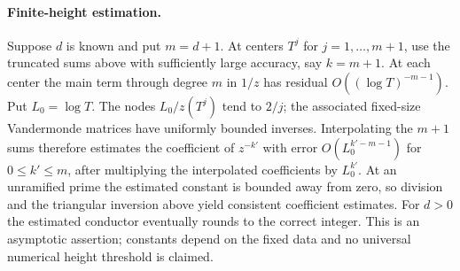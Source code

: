 \documentclass[11pt,letterpaper]{article}
\begin{document}
\paragraph{Finite-height estimation.}
Suppose $d$ is known and put $m=d+1$. At centers $T^j$ for
$j=1,\ldots,m+1$, use the truncated sums above with sufficiently large
accuracy, say $k=m+1$. At each center the main term through degree $m$
in $1/z$ has residual $O((\log T)^{-m-1})$. Put $L_0=\log T$. The
nodes $L_0/z(T^j)$ tend to $2/j$; the associated fixed-size Vandermonde
matrices have uniformly bounded inverses. Interpolating the $m+1$ sums
therefore estimates the coefficient of $z^{-k'}$ with error
$O(L_0^{k'-m-1})$ for $0\le k'\le m$, after multiplying the
interpolated coefficients by $L_0^{k'}$. At an unramified prime the
estimated constant is bounded away from zero, so division and the
triangular inversion above yield consistent coefficient estimates.
For $d>0$ the estimated conductor eventually rounds to the correct
integer. This is an asymptotic assertion; constants depend on the
fixed data and no universal numerical height threshold is claimed.
\end{document}
